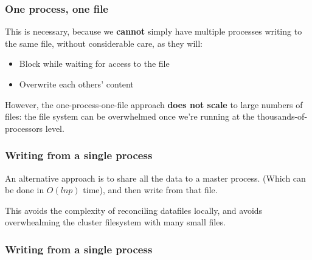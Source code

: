 \begin{Shaded}
\begin{Highlighting}[]

     \NormalTok{)}
\end{Highlighting}
\end{Shaded}

\subsubsection{One process, one file}\label{one-process-one-file-1}

This is necessary, because we \textbf{cannot} simply have multiple
processes writing to the same file, without considerable care, as they
will:

\begin{itemize}
\itemsep1pt\parskip0pt
\item
  Block while waiting for access to the file
\item
  Overwrite each others' content
\end{itemize}

However, the one-process-one-file approach \textbf{does not scale} to
large numbers of files: the file system can be overwhelmed once we're
running at the thousands-of-processors level.

\subsubsection{Writing from a single
process}\label{writing-from-a-single-process-1}

An alternative approach is to share all the data to a master process.
(Which can be done in $O(ln p)$ time), and then write from that file.

This avoids the complexity of reconciling datafiles locally, and avoids
overwhealming the cluster filesystem with many small files.

\subsubsection{Writing from a single
process}\label{writing-from-a-single-process-2}

